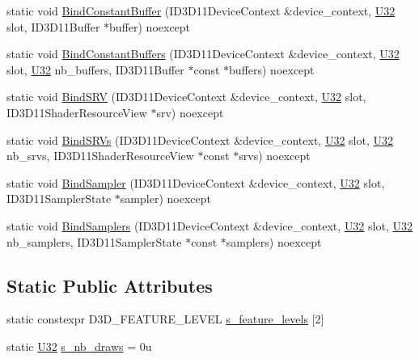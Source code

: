 \begin{DoxyCompactItemize}
\item 
static void \mbox{\hyperlink{structmage_1_1rendering_1_1_pipeline_a983ebf1363c8d3edd6830576e2258e48}{Bind\+Constant\+Buffer}} (I\+D3\+D11\+Device\+Context \&device\+\_\+context, \mbox{\hyperlink{namespacemage_a41c104c036fba3756a74e19f793eeaa1}{U32}} slot, I\+D3\+D11\+Buffer $\ast$buffer) noexcept
\item 
static void \mbox{\hyperlink{structmage_1_1rendering_1_1_pipeline_ad3a84d57712b74b98d10946482a78a2b}{Bind\+Constant\+Buffers}} (I\+D3\+D11\+Device\+Context \&device\+\_\+context, \mbox{\hyperlink{namespacemage_a41c104c036fba3756a74e19f793eeaa1}{U32}} slot, \mbox{\hyperlink{namespacemage_a41c104c036fba3756a74e19f793eeaa1}{U32}} nb\+\_\+buffers, I\+D3\+D11\+Buffer $\ast$const $\ast$buffers) noexcept
\item 
static void \mbox{\hyperlink{structmage_1_1rendering_1_1_pipeline_a28ed2d3639ac344b2d2334de54461ae9}{Bind\+S\+RV}} (I\+D3\+D11\+Device\+Context \&device\+\_\+context, \mbox{\hyperlink{namespacemage_a41c104c036fba3756a74e19f793eeaa1}{U32}} slot, I\+D3\+D11\+Shader\+Resource\+View $\ast$srv) noexcept
\item 
static void \mbox{\hyperlink{structmage_1_1rendering_1_1_pipeline_a38de6f4bfefc23eeeb50bdf0cc0e807d}{Bind\+S\+R\+Vs}} (I\+D3\+D11\+Device\+Context \&device\+\_\+context, \mbox{\hyperlink{namespacemage_a41c104c036fba3756a74e19f793eeaa1}{U32}} slot, \mbox{\hyperlink{namespacemage_a41c104c036fba3756a74e19f793eeaa1}{U32}} nb\+\_\+srvs, I\+D3\+D11\+Shader\+Resource\+View $\ast$const $\ast$srvs) noexcept
\item 
static void \mbox{\hyperlink{structmage_1_1rendering_1_1_pipeline_a3f43c5b1ed2d75d6c5ecf4b477185d0c}{Bind\+Sampler}} (I\+D3\+D11\+Device\+Context \&device\+\_\+context, \mbox{\hyperlink{namespacemage_a41c104c036fba3756a74e19f793eeaa1}{U32}} slot, I\+D3\+D11\+Sampler\+State $\ast$sampler) noexcept
\item 
static void \mbox{\hyperlink{structmage_1_1rendering_1_1_pipeline_a10286b4e2637c2956ecbcb0217d694fa}{Bind\+Samplers}} (I\+D3\+D11\+Device\+Context \&device\+\_\+context, \mbox{\hyperlink{namespacemage_a41c104c036fba3756a74e19f793eeaa1}{U32}} slot, \mbox{\hyperlink{namespacemage_a41c104c036fba3756a74e19f793eeaa1}{U32}} nb\+\_\+samplers, I\+D3\+D11\+Sampler\+State $\ast$const $\ast$samplers) noexcept
\end{DoxyCompactItemize}
\subsection*{Static Public Attributes}
\begin{DoxyCompactItemize}
\item 
static constexpr D3\+D\+\_\+\+F\+E\+A\+T\+U\+R\+E\+\_\+\+L\+E\+V\+EL \mbox{\hyperlink{structmage_1_1rendering_1_1_pipeline_a9748450c877ec6997796826258f3cbda}{s\+\_\+feature\+\_\+levels}} \mbox{[}2\mbox{]}
\item 
static \mbox{\hyperlink{namespacemage_a41c104c036fba3756a74e19f793eeaa1}{U32}} \mbox{\hyperlink{structmage_1_1rendering_1_1_pipeline_a47d649cdfea830ee048554accd2cab10}{s\+\_\+nb\+\_\+draws}} = 0u
\end{DoxyCompactItemize}
